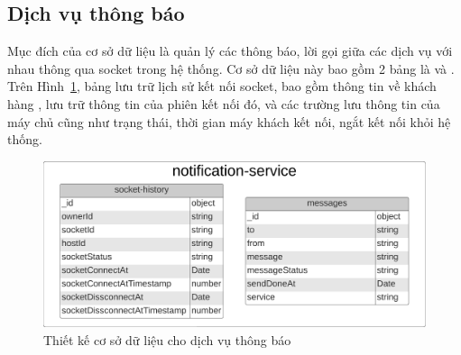 \subsection{Dịch vụ thông báo}
Mục đích của cơ sở dữ liệu  là quản lý các thông báo, lời gọi giữa các dịch vụ với nhau thông qua socket trong hệ thống.
Cơ sở dữ liệu này bao gồm 2 bảng là  và .
Trên Hình~\ref{fig:notification-service-database-design}, bảng  lưu trữ lịch sử kết nối socket, bao gồm thông tin về khách hàng ,  lưu trữ thông tin của phiên kết nối đó, và các trường lưu thông tin của máy chủ cũng như trạng thái, thời gian máy khách kết nối, ngắt kết nối khỏi hệ thống.
\begin{figure}[H]
	\centering
	\includegraphics[width=\textwidth]{images/hChip/MongoDB/notification-service-design.png}
	\caption{Thiết kế cơ sở dữ liệu cho dịch vụ thông báo}
	\label{fig:notification-service-database-design}
\end{figure}

